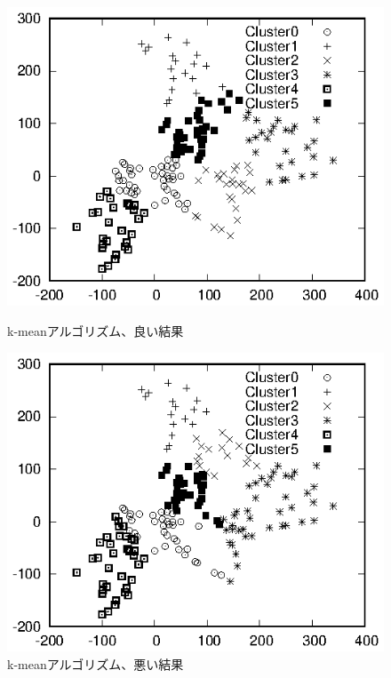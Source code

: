 \documentclass[a4j]{jarticle}
\begin{document}
\begin{figure}[tbp]
 \begin{minipage}{0.5\hsize}
  \begin{center}
   \includegraphics[width=\hsize]{fig/Hokkaido_xyl_seed1.eps}
  \end{center}
  \caption{k-meanアルゴリズム、良い結果}
  \label{fig:Hokkaido_xyl_seed1}
 \end{minipage}
 \begin{minipage}{0.5\hsize}
  \begin{center}
   \includegraphics[width=\hsize]{fig/Hokkaido_xyl_seed4.eps}
  \end{center}
  \caption{k-meanアルゴリズム、悪い結果}
  \label{fig:Hokkaido_xyl_seed4}
 \end{minipage}
\end{figure}
\end{document}
